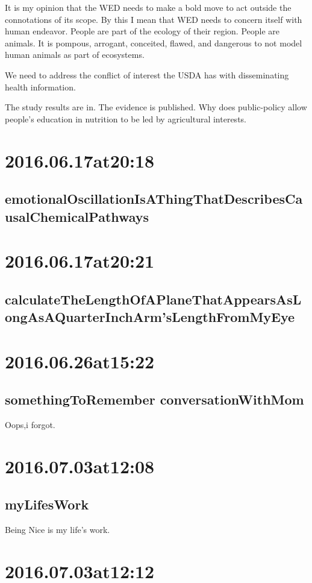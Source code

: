 It is my opinion that the WED needs to make a bold move to act outside the connotations of its scope. By this I mean that WED needs to concern itself with human endeavor. People are part of the ecology of their region. People are animals. It is pompous, arrogant, conceited, flawed, and dangerous to not model human animals as part of ecosystems.

We need to address the conflict of interest the USDA has with disseminating health information. 

The study results are in. The evidence is published. Why does public-policy allow people's education in nutrition to be led by agricultural interests.

\section*{ 2016.06.17at20:18 }
\subsection*{emotionalOscillationIsAThingThatDescribesCausalChemicalPathways}

\section*{ 2016.06.17at20:21 }
\subsection*{calculateTheLengthOfAPlaneThatAppearsAsLongAsAQuarterInchArm'sLengthFromMyEye}

\section*{ 2016.06.26at15:22 }
\subsection*{somethingToRemember conversationWithMom}
Oops,i forgot.

\section*{ 2016.07.03at12:08 }
\subsection*{myLifesWork}
Being Nice is my life's work.

\section*{ 2016.07.03at12:12 }
